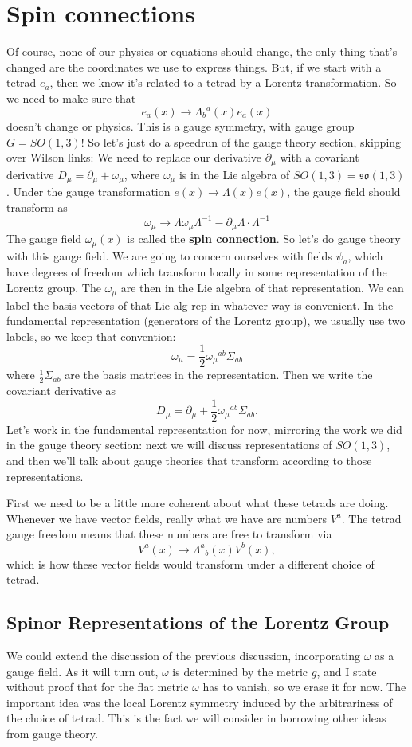 \documentclass[main.tex]{subfiles}
\begin{document}
\section{Spin connections}
Of course, none of our physics or equations should change, the only thing that's changed are the coordinates we use to express things. But, if we start with a tetrad $e_a$, then we know it's related to a tetrad by a Lorentz transformation. So we need to make sure that
\[
e_a (x) \to {\Lambda_b}^{a} (x) e_a (x)
\]
doesn't change or physics. This is a gauge symmetry, with gauge group $G = SO(1,3)$! So let's just do a speedrun of the gauge theory section, skipping over Wilson links: We need to replace our derivative $\partial_\mu$ with a covariant derivative $D_\mu = \partial_\mu + \omega_\mu$, where $\omega_\mu$ is in the Lie algebra of $SO(1,3) = \mathfrak{so}(1,3)$. Under the gauge transformation $e(x) \to \Lambda(x) e(x)$, the gauge field should transform as
\[
\omega_\mu \to \Lambda \omega_\mu \Lambda^{-1} - \partial_\mu \Lambda \cdot \Lambda^{-1}
\]
The gauge field $\omega_\mu (x)$ is called the \textbf{spin connection}. So let's do gauge theory with this gauge field. We are going to concern ourselves with fields $\psi_a$, which have degrees of freedom which transform locally in some representation of the Lorentz group. The $\omega_\mu$ are then in the Lie algebra of that representation. We can label the basis vectors of that Lie-alg rep in whatever way is convenient. In the fundamental representation (generators of the Lorentz group), we usually use two labels, so we keep that convention:
\[
\omega_\mu = \frac{1}{2} {\omega_\mu}^{ab} \Sigma_{ab}
\]
where $\frac{1}{2} \Sigma_{ab}$ are the basis matrices in the representation. Then we write the covariant derivative as
\[
D_\mu = \partial_\mu + \frac{1}{2} {\omega_\mu}^{ab} \Sigma_{ab}.
\]
Let's work in the fundamental representation for now, mirroring the work we did in the gauge theory section: next we will discuss representations of $SO(1,3)$, and then we'll talk about gauge theories that transform according to those representations.

First we need to be a little more coherent about what these tetrads are doing. Whenever we have vector fields, really what we have are numbers $V^a$. The tetrad gauge freedom means that these numbers are free to transform via
\[
V^a (x) \to {\Lambda^a}_b (x) V^b (x),
\]
which is how these vector fields would transform under a different choice of tetrad. 

\newpage

\subsection{Spinor Representations of the Lorentz Group}
We could extend the discussion of the previous discussion, incorporating $\omega$ as a gauge field. As it will turn out, $\omega$ is determined by the metric $g$, and I state without proof that for the flat metric $\omega$ has to vanish, so we erase it for now. The important idea was the local Lorentz symmetry induced by the arbitrariness of the choice of tetrad. This is the fact we will consider in borrowing other ideas from gauge theory. 
\end{document}

